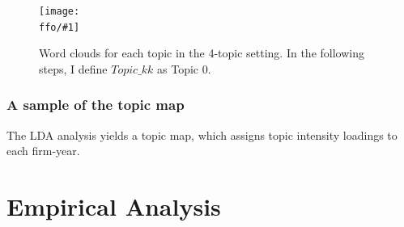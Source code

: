 \documentclass{beamer}
\newcommand{\ffo}{dicfullmc10thr10defnob40noa1_4t}
\newcommand{\insertfigure}[2]{
\begin{figure}[h!]
  \centering
  \texttt{[image: \\ffo/\#1]}
  \centering
  \captionsetup{font=scriptsize}
  \caption{#2}
  \label{fig:#1}
\end{figure}
}
\begin{document}
\begin{frame}
	\insertfigure{wordclouds}{Word clouds for each topic in the 4-topic setting. In the following steps, I define $Topic\_kk$ as Topic 0.}
\end{frame}



\begin{frame}
  \frametitle{A sample of the topic map}
The LDA analysis yields a topic map, which assigns topic intensity loadings to each firm-year.
   \tiny
  
\end{frame}


\section{Empirical Analysis}
\end{document}
